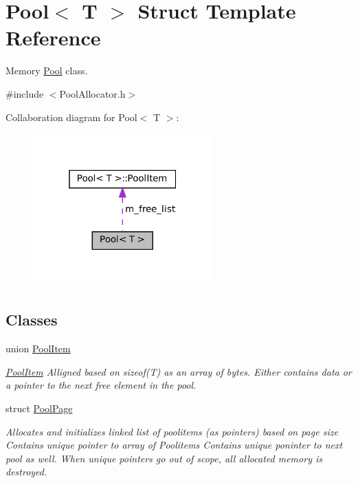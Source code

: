 \hypertarget{structPool}{}\section{Pool$<$ T $>$ Struct Template Reference}
\label{structPool}


Memory \hyperlink{structPool}{Pool} class.  




{\ttfamily \#include $<$Pool\+Allocator.\+h$>$}



Collaboration diagram for Pool$<$ T $>$\+:
\nopagebreak
\begin{figure}[H]
\begin{center}
\leavevmode
\includegraphics[width=196pt]{structPool__coll__graph}
\end{center}
\end{figure}
\subsection*{Classes}
\begin{DoxyCompactItemize}
\item 
union \hyperlink{unionPool_1_1PoolItem}{Pool\+Item}
\begin{DoxyCompactList}\small\item\em \hyperlink{unionPool_1_1PoolItem}{Pool\+Item} Alligned based on sizeof(\+T) as an array of bytes. Either contains data or a pointer to the next free element in the pool. \end{DoxyCompactList}\item 
struct \hyperlink{structPool_1_1PoolPage}{Pool\+Page}
\begin{DoxyCompactList}\small\item\em Allocates and initializes linked list of poolitems (as pointers) based on page size Contains unique pointer to array of Poolitems Contains unique poninter to next pool as well. When unique pointers go out of scope, all allocated memory is destroyed. \end{DoxyCompactList}\end{DoxyCompactItemize}
